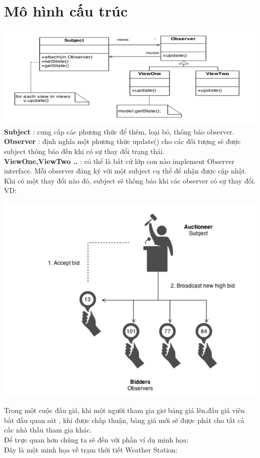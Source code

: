 \section{Mô hình cấu trúc}
\includegraphics{GALLEYS/images/chapter2/diagram1}\\
\textbf{Subject} : cung cấp các phương thức để thêm, loại bỏ, thông báo observer.\\
\textbf{Observer} : định nghĩa một phương thức update() cho các đối tượng sẽ được subject thông báo đến khi có sự thay đổi trạng thái. \\
\textbf{ViewOne,ViewTwo ..} : có thể là bất cứ lớp con nào implement Observer interface. Mỗi observer đăng ký với một subject cụ thể để nhận được cập nhật.\\
Khi có một thay đổi nào đó, subject sẽ thông báo khi các observer có sự thay đổi. VD:
\begin{center}
	\includegraphics{GALLEYS/images/chapter2/exdiagram}\\
\end{center}
\hspace{0.5cm}Trong một cuộc đấu giá, khi một người tham gia giơ bảng giá lên,đấu giá viên bắt đầu quan sát , khi được chấp thuận, bảng giá mới sẽ được phát cho tất cả cấc nhà thầu tham gia khác.\\
   Để trực quan hơn chúng ta sẽ đến với phần ví dụ minh họa:\\
   Đây là một minh họa về trạm thời tiết Weather Station:\\

